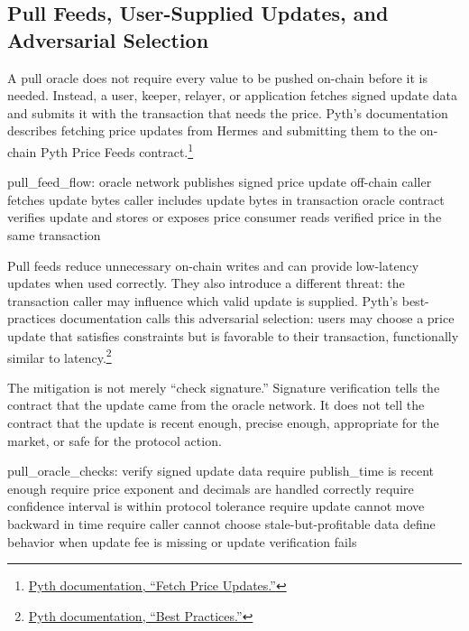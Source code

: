 \subsection{Pull Feeds, User-Supplied Updates, and Adversarial Selection}

A pull oracle does not require every value to be pushed on-chain before it is needed. Instead, a user, keeper, relayer, or application fetches signed update data and submits it with the transaction that needs the price. Pyth's documentation describes fetching price updates from Hermes and submitting them to the on-chain Pyth Price Feeds contract.\footnote{\href{https://docs.pyth.network/price-feeds/core/fetch-price-updates}{Pyth documentation, ``Fetch Price Updates.''}}

\begin{codeblock}
pull_feed_flow:
    oracle network publishes signed price update off-chain
    caller fetches update bytes
    caller includes update bytes in transaction
    oracle contract verifies update and stores or exposes price
    consumer reads verified price in the same transaction
\end{codeblock}

Pull feeds reduce unnecessary on-chain writes and can provide low-latency updates when used correctly. They also introduce a different threat: the transaction caller may influence which valid update is supplied. Pyth's best-practices documentation calls this adversarial selection: users may choose a price update that satisfies constraints but is favorable to their transaction, functionally similar to latency.\footnote{\href{https://docs.pyth.network/price-feeds/core/best-practices}{Pyth documentation, ``Best Practices.''}}

The mitigation is not merely ``check signature.'' Signature verification tells the contract that the update came from the oracle network. It does not tell the contract that the update is recent enough, precise enough, appropriate for the market, or safe for the protocol action.

\begin{codeblock}
pull_oracle_checks:
    verify signed update data
    require publish_time is recent enough
    require price exponent and decimals are handled correctly
    require confidence interval is within protocol tolerance
    require update cannot move backward in time
    require caller cannot choose stale-but-profitable data
    define behavior when update fee is missing or update verification fails
\end{codeblock}

